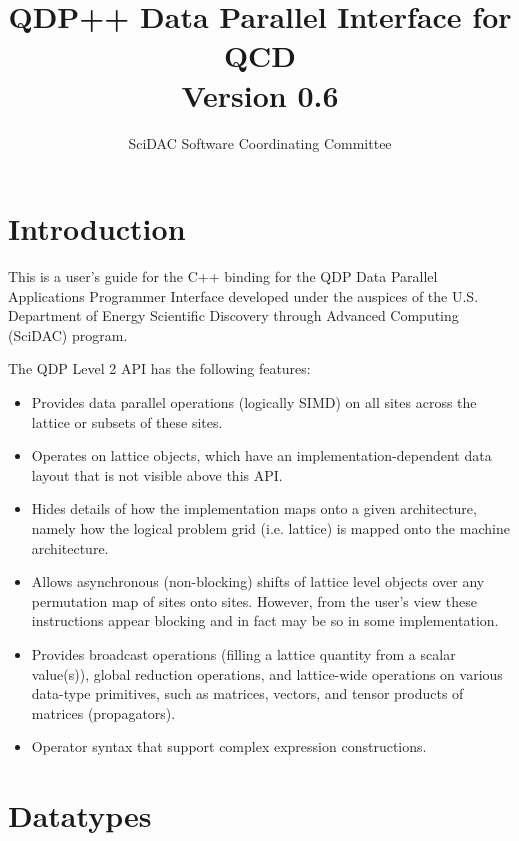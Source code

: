 \documentclass[12pt,letterpaper]{article}
\newcommand{\cpp}{C++}
\begin{document}
\title{
   QDP++ Data Parallel Interface for QCD  \\{\large Version 0.6}
}
\author{SciDAC Software Coordinating Committee}

\maketitle
\section{Introduction}
This is a user's guide for the \cpp{} binding for the QDP Data Parallel
Applications Programmer Interface developed under the auspices of the
U.S. Department of Energy Scientific Discovery through Advanced
Computing (SciDAC) program.

The QDP Level 2 API has the following features:
\begin{itemize}
\item Provides data parallel operations (logically SIMD) on all sites
across the lattice or subsets of these sites.
\item Operates on lattice objects, which have an
implementation-dependent data layout that is not visible above this
API.
\item Hides details of how the implementation maps onto a given
architecture, namely how the logical problem grid (i.e. lattice) is
mapped onto the machine architecture.
\item Allows asynchronous (non-blocking) shifts of lattice level
objects over any permutation map of sites onto sites. However, from
the user's view these instructions appear blocking and in fact may be
so in some implementation.
\item Provides broadcast operations (filling a lattice quantity from a
scalar value(s)), global reduction operations, and lattice-wide
operations on various data-type primitives, such as matrices, vectors,
and tensor products of matrices (propagators).
\item
Operator syntax that support complex expression constructions.
\end{itemize}

\section{Datatypes}
\label{sec.datatypes}
\end{document}
